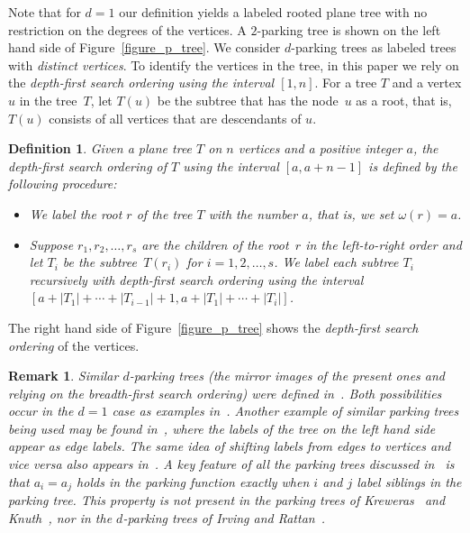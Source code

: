 \documentclass[11pt]{amsart}
\newtheorem{definition}[theorem]{Definition}
\newtheorem{remark}[theorem]{Remark}
\numberwithin{equation}{section}
\begin{document}
Note that for $d=1$ our definition yields a labeled rooted plane tree
with no restriction on the degrees of the vertices.  
A $2$-parking tree is shown on the left hand side of
Figure~\ref{figure_p_tree}. We consider $d$-parking trees as labeled
trees with {\em distinct vertices}. To identify the vertices in the
tree, in this paper we rely on the {\em depth-first search ordering
using the interval $[1,n]$}.
For a tree $T$ and a vertex $u$ in the tree~$T$, let $T(u)$ be the subtree
that has the node~$u$ as a root, that is, $T(u)$ consists of all
vertices that are descendants of $u$.


\begin{definition}
Given a plane tree $T$ on $n$ vertices and a positive integer $a$, the
{\em depth-first search ordering of $T$ using the interval $[a,a+n-1]$}
is defined by the following procedure:
\begin{itemize}
\item[(1)] We label the root $r$ of the tree $T$ with the number $a$,
that is, we set $\omega(r) = a$.
\item[(2)] Suppose $r_{1},r_{2},\ldots,r_{s}$ are the children of the root~$r$ in
  the left-to-right order and let $T_{i}$ be the subtree~$T(r_{i})$ for
  $i=1,2,\ldots,s$. We label each subtree $T_{i}$ recursively with
  depth-first search ordering using the
  interval $[a+|T_{1}|+\cdots+|T_{i-1}|+1,a+|T_{1}|+\cdots+|T_{i}|]$.
\end{itemize}
\end{definition}


The right hand side of Figure~\ref{figure_p_tree}
shows the {\em depth-first search ordering} of the vertices.
\begin{remark}
\label{remark_ourtrees}  
{\rm Similar $d$-parking trees (the mirror images of the
present ones and relying on the breadth-first search ordering) were defined
in~\cite[Section~6]{Hetyei}. Both possibilities
occur in the $d=1$ case as examples in~\cite[Section~13.2.3]{Yan_chapter}.
Another example of similar parking trees being
used may be found in~\cite{Ehrenborg_Hetyei_Readdy}, where the labels of
the tree on the left hand side appear as edge labels. The same idea of
shifting labels from edges to vertices and vice versa also appears
in~\cite{Irving_Rattan}. A key feature of all the 
parking trees discussed in~\cite[Section 13.2.3]{Yan_chapter} is that
$a_i=a_j$ holds in the parking function exactly when $i$ and $j$ label
siblings in the parking tree. This property is {\em not present} in the
parking trees of Kreweras~\cite{Kreweras_suites} and 
Knuth~\cite[Section~13.2.2]{Yan_chapter}, nor in the $d$-parking trees
of Irving and Rattan~\cite{Irving_Rattan}.}   
\end{remark}  
\end{document}
